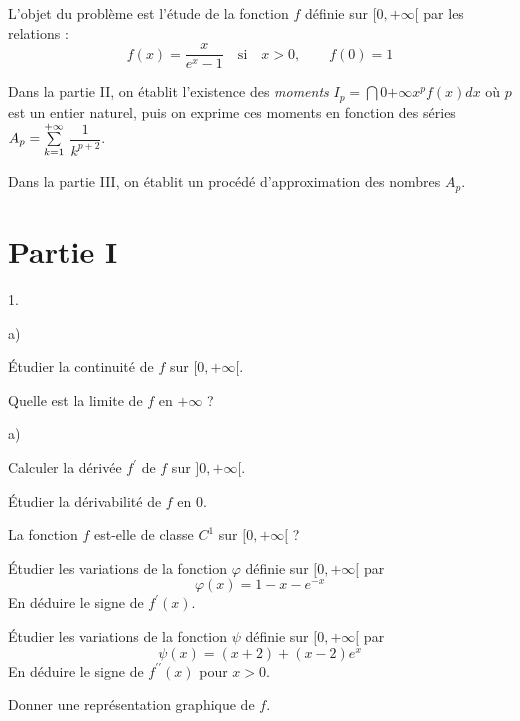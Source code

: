 \documentclass[11pt]{article}%
\begin{document}
L'objet du problème est l'étude de la fonction $f$ définie sur $[0, +
\infty
\lbrack $ par les relations : 
\[
f(x) = {\dfrac{x}{e^{x}-1}}\quad \text{si}\quad {}x>0,\qquad {}f(0) = 1
\]

Dans la partie II, on établit l'existence des \textit{moments} $I_{p} =
\dint{0}{+ \infty }x^{p}f(x)dx$ où $p$ est un entier naturel,
puis on exprime ces moments en fonction des séries $A_{p} = {\textstyle\sum\limits_{k =
1}^{+ \infty }}\hspace{.1cm}${$\dfrac{1}{k^{p + 2}}$}.

Dans la partie III, on établit un procédé d'approximation des nombres
$A_{p}$.

\section*{Partie I}

\begin{noliste}{1.}
 \setlength{\itemsep}{4mm}
\item 

\begin{noliste}{a)}
 \setlength{\itemsep}{2mm}
\item Étudier la continuité de $f$ sur $[0, + \infty \lbrack $.

\item Quelle est la limite de $f$ en $ + \infty $ ?
\end{noliste}

\item 

\begin{noliste}{a)}
 \setlength{\itemsep}{2mm}
\item Calculer la dérivée $f^{\prime }$ de $f$ sur $]0, + \infty
\lbrack $.

\item Étudier la dérivabilité de $f$ en 0.

\item La fonction $f$ est-elle de classe $C^{1}$ sur $[0, + \infty
\lbrack $ ?
\end{noliste}

\item Étudier les variations de la fonction $\varphi $ définie sur $[0,
+ \infty \lbrack $ par 
\[
\varphi (x) = 1-x-e^{-x}
\]
En déduire le signe de $f^{\prime }(x)$.

\item Étudier les variations de la fonction $\psi $ définie sur $[0, +
\infty
\lbrack $ par 
\[
\psi (x) = (x + 2) + (x-2)e^{x}
\]
En déduire le signe de $f^{\prime \prime }(x)$ pour $x>0$.

\item Donner une représentation graphique de $f$.
\end{noliste}
\end{document}
